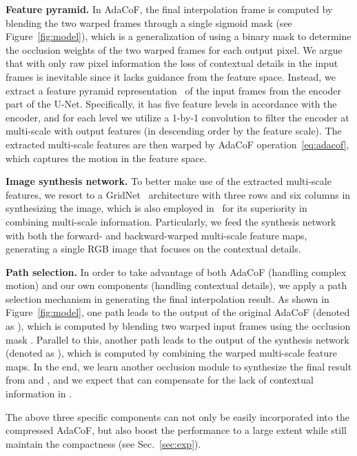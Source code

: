 \documentclass[final]{cvpr}
\newcommand{\myparagraph}[1]{\textbf{#1}}
\begin{document}
\myparagraph{Feature pyramid.} In AdaCoF, the final interpolation frame is computed by blending the two warped frames through a single sigmoid mask  (see Figure~\ref{fig:model}), which is a generalization of using a binary mask to determine the occlusion weights of the two warped frames for each output pixel. We argue that with only raw pixel information the loss of  contextual details in the input frames is inevitable since it lacks guidance from the feature space. Instead, we extract a feature pyramid representation~\cite{niklaus2020softmax} of the input frames from the encoder part of the U-Net. Specifically, it has five feature levels in accordance with the encoder, and for each level we utilize a 1-by-1 convolution to filter the encoder at multi-scale with  output features (in descending order by the feature scale). The extracted multi-scale features are then warped by AdaCoF operation~\eqref{eq:adacof}, which captures the motion in the feature space.




\myparagraph{Image synthesis network.} To better make use of the extracted multi-scale features, we resort to a GridNet~\cite{fourure2017residual} architecture with three rows and six columns in synthesizing the image, which is also employed in~\cite{niklaus2018context,niklaus2020softmax} for its superiority in combining multi-scale information.  Particularly, we feed the synthesis network with both the forward- and backward-warped multi-scale feature maps, generating a single RGB image that focuses on the contextual details.

\myparagraph{Path selection.} In order to take advantage of both AdaCoF (handling complex motion) and our own components (handling contextual details), we apply a path selection mechanism in generating the final interpolation result. As shown in Figure~\ref{fig:model}, one path leads to the output of the original AdaCoF (denoted as ), which is computed by blending two warped input frames using the occlusion mask . Parallel to this, another path leads to the output of the synthesis network (denoted as ), which is computed by combining the warped multi-scale feature maps. In the end, we learn another occlusion module  to synthesize the final result from  and , and we expect that  can compensate for the lack of contextual information in .


The above three specific components can not only be easily incorporated into the compressed AdaCoF, but also boost the performance to a large extent while still maintain the compactness (see Sec.~\ref{sec:exp}).
\end{document}
